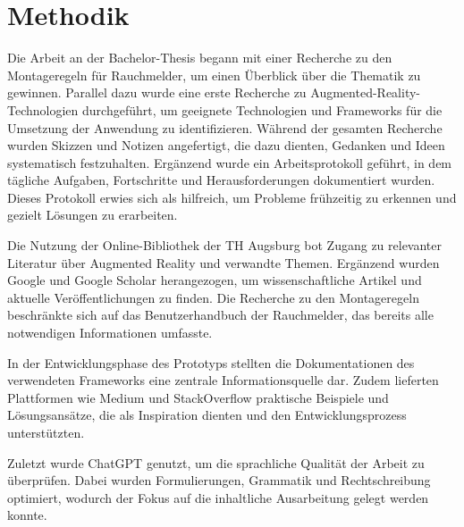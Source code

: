 \chapter{Methodik}

Die Arbeit an der Bachelor-Thesis begann mit einer Recherche zu den Montageregeln für Rauchmelder, um einen Überblick über die Thematik zu gewinnen. Parallel dazu wurde eine erste Recherche zu Augmented-Reality-Technologien durchgeführt, um geeignete Technologien und Frameworks für die Umsetzung der Anwendung zu identifizieren. Während der gesamten Recherche wurden Skizzen und Notizen angefertigt, die dazu dienten, Gedanken und Ideen systematisch festzuhalten. Ergänzend wurde ein Arbeitsprotokoll geführt, in dem tägliche Aufgaben, Fortschritte und Herausforderungen dokumentiert wurden. Dieses Protokoll erwies sich als hilfreich, um Probleme frühzeitig zu erkennen und gezielt Lösungen zu erarbeiten.

Die Nutzung der Online-Bibliothek der TH Augsburg bot Zugang zu relevanter Literatur über Augmented Reality und verwandte Themen. Ergänzend wurden Google und Google Scholar herangezogen, um wissenschaftliche Artikel und aktuelle Veröffentlichungen zu finden. Die Recherche zu den Montageregeln beschränkte sich auf das Benutzerhandbuch der Rauchmelder, das bereits alle notwendigen Informationen umfasste.

In der Entwicklungsphase des Prototyps stellten die Dokumentationen des verwendeten Frameworks eine zentrale Informationsquelle dar. Zudem lieferten Plattformen wie Medium und StackOverflow praktische Beispiele und Lösungsansätze, die als Inspiration dienten und den Entwicklungsprozess unterstützten.

Zuletzt wurde ChatGPT genutzt, um die sprachliche Qualität der Arbeit zu überprüfen. Dabei wurden Formulierungen, Grammatik und Rechtschreibung optimiert, wodurch der Fokus auf die inhaltliche Ausarbeitung gelegt werden konnte.
